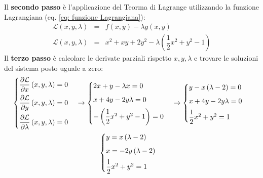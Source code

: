 \documentclass[a4paper]{article}
\begin{document}
	\noindent
	Il \textbf{secondo passo} è l'applicazione del Teorma di Lagrange utilizzando la funzione Lagrangiana (eq. \ref{eq: funzione Lagrangiana}):
	\begin{equation*}
		\begin{array}{rcl}
			\mathcal{L}\left(x,y,\lambda\right) &=& f\left(x,y\right) - \lambda g\left(x,y\right) \\ [.5em]
			\mathcal{L}\left(x,y,\lambda\right) &=& x^{2} + xy + 2y^{2} - \lambda \left(\dfrac{1}{2}x^{2} + y^{2} - 1\right)
		\end{array}
	\end{equation*}
	Il \textbf{terzo passo} è calcolare le derivate parziali rispetto $x,y,\lambda$ e trovare le soluzioni del sistema posto uguale a zero:
	\begin{gather*}
		\begin{cases}
			\dfrac{\partial\mathcal{L}}{\partial x}\left(x,y,\lambda\right) = 0 \vspace{.5em}\\
			\dfrac{\partial\mathcal{L}}{\partial y}\left(x,y,\lambda\right) = 0 \vspace{.5em}\\
			\dfrac{\partial\mathcal{L}}{\partial \lambda}\left(x,y,\lambda\right) = 0
		\end{cases}
		\rightarrow
		\begin{cases}
			2x + y - \lambda x = 0 \vspace{.5em}\\
			x + 4y - 2y\lambda = 0 \vspace{.5em}\\
			-\left(\dfrac{1}{2}x^{2} + y^{2} - 1\right) = 0
		\end{cases}
		\rightarrow
		\begin{cases}
			y - x\left(\lambda - 2\right) = 0 \vspace{.5em}\\
			x + 4y - 2y\lambda = 0 \vspace{.5em}\\
			\dfrac{1}{2}x^{2} + y^{2} = 1
		\end{cases}
		\\
		\begin{cases}
			y = x\left(\lambda - 2\right) \vspace{.5em}\\
			x = - 2y\left(\lambda - 2\right) \vspace{.5em}\\
			\dfrac{1}{2}x^{2} + y^{2} = 1
		\end{cases}

\end{gather*}
\end{document}
